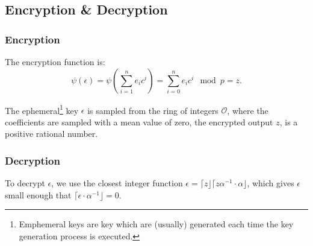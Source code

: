 
\subsection*{Encryption \& Decryption}
 
\subsubsection*{Encryption}

The encryption function is:
$$ \psi(\epsilon) = \psi \left( \sum_{i=1}^{n}e_{i}c^{i} \right) = \sum_{i=0}^{n} e_{i}c^{i}\mod{p}=z. $$

The ephemeral\footnote{Emphemeral keys are key which are (usually)  generated each time the key generation process is executed. } key $\epsilon$ is sampled from the ring of integers $\mathcal{O}$, where the coefficients are sampled with a mean value of zero, the encrypted output $z$, is a positive rational number.
 
\subsubsection*{Decryption}

To decrypt $\epsilon$, we use the closest integer function $\epsilon = \lceil z \rfloor \lceil z\alpha^{-1}\cdot \alpha \rfloor$, which gives $\epsilon$ small enough that $\lceil \epsilon \cdot \alpha^{-1}\rfloor = 0$. 
